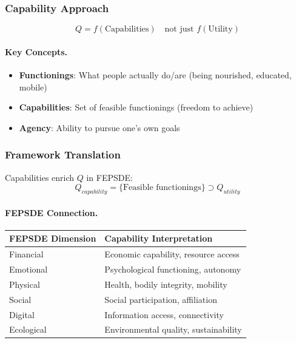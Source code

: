 \subsubsection{Capability Approach}

\begin{equation}
\boxed{
Q = f(\text{Capabilities}) \quad \text{not just } f(\text{Utility})
}
\label{eq:capability}
\end{equation}

\paragraph{Key Concepts.}
\begin{itemize}
    \item \textbf{Functionings}: What people actually do/are (being nourished, educated, mobile)
    \item \textbf{Capabilities}: Set of feasible functionings (freedom to achieve)
    \item \textbf{Agency}: Ability to pursue one's own goals
\end{itemize}

\subsubsection{Framework Translation}

Capabilities enrich $Q$ in FEPSDE:
\begin{equation}
Q_{capability} = \{\text{Feasible functionings}\} \supset Q_{utility}
\end{equation}

\paragraph{FEPSDE Connection.}
\begin{center}
\renewcommand{\arraystretch}{1.3}
\begin{tabular}{|l|l|}
\hline
\textbf{FEPSDE Dimension} & \textbf{Capability Interpretation} \\
\hline
Financial & Economic capability, resource access \\
Emotional & Psychological functioning, autonomy \\
Physical & Health, bodily integrity, mobility \\
Social & Social participation, affiliation \\
Digital & Information access, connectivity \\
Ecological & Environmental quality, sustainability \\
\hline
\end{tabular}
\end{center}

